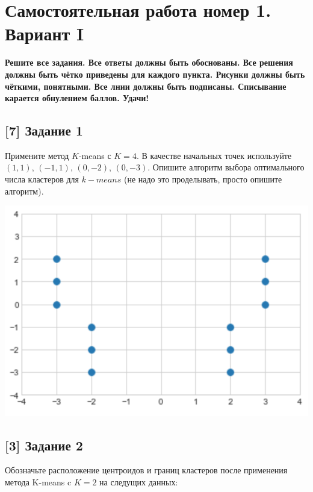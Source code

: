 \documentclass[12pt, a4paper, oneside]{article}
\begin{document}
\section*{Самостоятельная работа номер 1. Вариант I}

\textbf{Решите все задания. Все ответы должны быть обоснованы. Все решения должны быть чётко приведены для каждого пункта. Рисунки должны быть чёткими, понятными. Все лнии должны быть подписаны. Списывание карается обнулением баллов. Удачи!}

\subsection*{[7] Задание 1}

Примените метод $K$-means с $K=4$. В качестве начальных точек используйте $(1,1)$, $(-1,1)$, $(0,-2)$, $(0,-3)$.	Опишите алгоритм выбора оптимального числа кластеров для $k-means$ (не надо это проделывать, просто опишите алгоритм).

\begin{center}
\includegraphics[scale=0.3]{knn_3.png}
\end{center}


\subsection*{[3] Задание 2}

Обозначьте расположение центроидов и границ кластеров после применения метода K-means c $K=2$ на следущих данных: 
\end{document}
